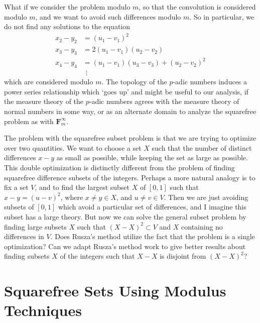 \documentclass{report}
\theoremstyle{plain}
\theoremstyle{plain}
\begin{document}
What if we consider the problem modulo $m$, so that the convolution is considered modulo $m$, and we want to avoid such differences modulo $m$. So in particular, we do not find any solutions to the equation
%
\begin{align*}
    x_2 - y_2 &= (u_1 - v_1)^2\\
    x_3 - y_3 &= 2 (u_1 - v_1)(u_2 - v_2)\\
    x_4 - y_4 &= (u_1 - v_1)(u_3 - v_3) + (u_2 - v_2)^2\\
    &\ \ \vdots
\end{align*}
%
which are considered modulo $m$. The topology of the $p$-adic numbers induces a power series relationship which `goes up' and might be useful to our analysis, if the measure theory of the $p$-adic numbers agrees with the measure theory of normal numbers in some way, or as an alternate domain to analyze the squarefree problem as with $\mathbf{F}_m^\infty$.

The problem with the squarefree subset problem is that we are trying to optimize over two quantities. We want to choose a set $X$ such that the number of distinct differences $x - y$ as small as possible, while keeping the set as large as possible. This double optimization is distinctly different from the problem of finding squarefree difference subsets of the integers. Perhaps a more natural analogy is to fix a set $V$, and to find the largest subset $X$ of $[0,1]$ such that $x - y = (u - v)^2$, where $x \neq y \in X$, and $u \neq v \in V$. Then we are just avoiding subsets of $[0,1]$ which avoid a particular set of differences, and I imagine this subset has a large theory. But now we can solve the general subset problem by finding large subsets $X$ such that $(X - X)^2 \subset V$ and $X$ containing no differences in $V$. Does Rusza's method utilize the fact that the problem is a single optimization? Can we adapt Rusza's method work to give better results about finding subsets $X$ of the integers such that $X - X$ is disjoint from $(X - X)^2$?

\section{Squarefree Sets Using Modulus Techniques}
\end{document}

